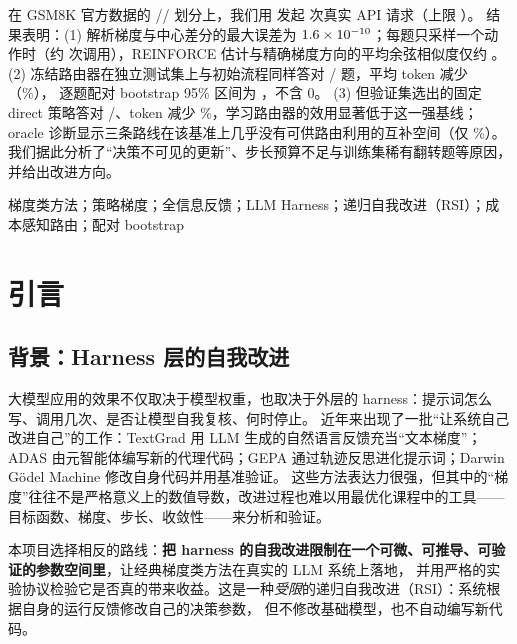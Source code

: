 \documentclass[a4paper,zihao=5,linespread=1.38]{ctexart}
\newcommand{\code}[1]{\texttt{\detokenize{#1}}}
\newcommand{\act}[1]{\textsf{#1}}
\begin{document}
在 GSM8K 官方数据的 \numTrainN{}/\numValN{}/\numTestN{} 划分上，我们用 \code{deepseek-v4.1-flash} 发起 \numAttempts{} 次真实 API 请求（上限 \numMaxRequests{}）。
结果表明：(1) 解析梯度与中心差分的最大误差为 $1.6\times10^{-10}$；每题只采样一个动作时（约 \numReinforceCalls{} 次调用），REINFORCE 估计与精确梯度方向的平均余弦相似度仅约 \numReinforceCos{}。
(2) 冻结路由器在独立测试集上与初始流程同样答对 \numLearnedCorrect{}/\numTestN{} 题，平均 token 减少 \numSavedPerTask{}（\numLearnedTokenChange\%），
逐题配对 bootstrap 95\% 区间为 \numVsInitTokCI{}，不含 0。
(3) 但验证集选出的固定 \act{direct} 策略答对 \numBestCorrect{}/\numTestN{}、token 减少 \numBestTokenChange\%，学习路由器的效用显著低于这一强基线；
oracle 诊断显示三条路线在该基准上几乎没有可供路由利用的互补空间（仅 \numOracleExtraPct\%）。
我们据此分析了“决策不可见的更新”、步长预算不足与训练集稀有翻转题等原因，并给出改进方向。

\vspace{6pt}
梯度类方法；策略梯度；全信息反馈；LLM Harness；递归自我改进（RSI）；成本感知路由；配对 bootstrap

\clearpage
{\hypersetup{linkcolor=ink}\small\tableofcontents}

\clearpage
{}
\setcounter{page}{1}

\section{引言}\label{sec:intro}

\subsection{背景：Harness 层的自我改进}
大模型应用的效果不仅取决于模型权重，也取决于外层的 harness：提示词怎么写、调用几次、是否让模型自我复核、何时停止。
近年来出现了一批“让系统自己改进自己”的工作：TextGrad 用 LLM 生成的自然语言反馈充当“文本梯度”\cite{textgrad}；
ADAS 由元智能体编写新的代理代码\cite{adas}；GEPA 通过轨迹反思进化提示词\cite{gepa}；Darwin Gödel Machine 修改自身代码并用基准验证\cite{dgm}。
这些方法表达力很强，但其中的“梯度”往往不是严格意义上的数值导数，改进过程也难以用最优化课程中的工具——目标函数、梯度、步长、收敛性——来分析和验证。

本项目选择相反的路线：\textbf{把 harness 的自我改进限制在一个可微、可推导、可验证的参数空间里}，让经典梯度类方法在真实的 LLM 系统上落地，
并用严格的实验协议检验它是否真的带来收益。这是一种\emph{受限}的递归自我改进（RSI）：系统根据自身的运行反馈修改自己的决策参数，
但不修改基础模型，也不自动编写新代码。
\end{document}

